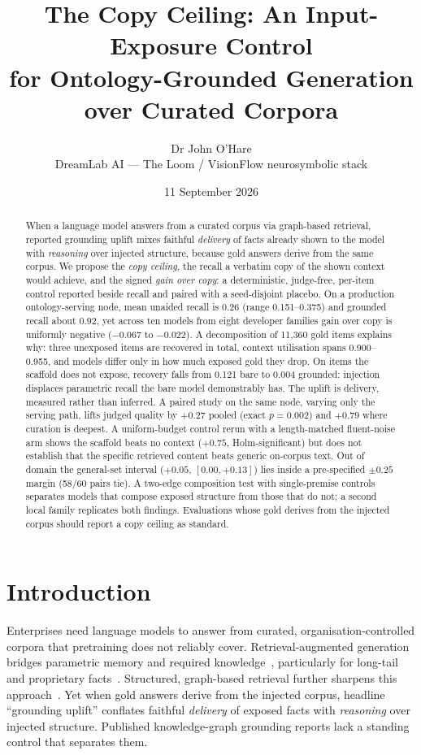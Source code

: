 \documentclass[10pt,twocolumn]{article}
\title{\vspace{-1.2cm}\bfseries The Copy Ceiling: An Input-Exposure Control\\
for Ontology-Grounded Generation over Curated Corpora}
\author{Dr John O'Hare\\ \small DreamLab AI --- The Loom / VisionFlow neurosymbolic stack}
\date{11 September 2026}
\begin{document}
\maketitle

\begin{abstract}
\noindent
When a language model answers from a curated corpus via graph-based retrieval, reported grounding uplift mixes faithful \emph{delivery} of facts already shown to the model with \emph{reasoning} over injected structure, because gold answers derive from the same corpus. We propose the \emph{copy ceiling}, the recall a verbatim copy of the shown context would achieve, and the signed \emph{gain over copy}: a deterministic, judge-free, per-item control reported beside recall and paired with a seed-disjoint placebo. On a production ontology-serving node, mean unaided recall is 0.26 (range 0.151--0.375) and grounded recall about 0.92, yet across ten models from eight developer families gain over copy is uniformly negative ($-0.067$ to $-0.022$). A decomposition of 11{,}360 gold items explains why: three unexposed items are recovered in total, context utilisation spans 0.900--0.955, and models differ only in how much exposed gold they drop. On items the scaffold does not expose, recovery falls from 0.121 bare to 0.004 grounded: injection displaces parametric recall the bare model demonstrably has. The uplift is delivery, measured rather than inferred. A paired study on the same node, varying only the serving path, lifts judged quality by $+0.27$ pooled (exact $p=0.002$) and $+0.79$ where curation is deepest. A uniform-budget control rerun with a length-matched fluent-noise arm shows the scaffold beats no context ($+0.75$, Holm-significant) but does not establish that the specific retrieved content beats generic on-corpus text. Out of domain the general-set interval ($+0.05$, $[0.00,+0.13]$) lies inside a pre-specified $\pm0.25$ margin (58/60 pairs tie). A two-edge composition test with single-premise controls separates models that compose exposed structure from those that do not; a second local family replicates both findings. Evaluations whose gold derives from the injected corpus should report a copy ceiling as standard.
\end{abstract}

\section{Introduction}\label{sec:intro}
Enterprises need language models to answer from curated, organisation-controlled corpora that pretraining does not reliably cover. Retrieval-augmented generation bridges parametric memory and required knowledge~\cite{lewis2020rag,gao2023ragsurvey}, particularly for long-tail and proprietary facts~\cite{mallen2023trust}. Structured, graph-based retrieval further sharpens this approach~\cite{edge2024graphrag,guo2024lightrag,baek2023kaping,pan2024unifying}. Yet when gold answers derive from the injected corpus, headline ``grounding uplift'' conflates faithful \emph{delivery} of exposed facts with \emph{reasoning} over injected structure. Published knowledge-graph grounding reports lack a standing control that separates them.
\end{document}
